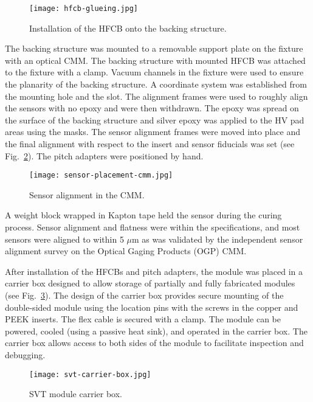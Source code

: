 \begin{figure}[hbt] 
\centering 
\texttt{[image: hfcb-glueing.jpg]}
\caption{Installation of the HFCB onto the backing structure.}
\label{fig:hfcb-glueing}
\end{figure}

The backing structure was mounted to a removable support plate on the fixture with an optical CMM. The backing structure with mounted HFCB was attached to the fixture with a clamp. Vacuum channels in the fixture were used to ensure the planarity of the backing structure. A coordinate system was established from the mounting hole and the slot. The alignment frames were used to roughly align the sensors with no epoxy and were then withdrawn. 
 The epoxy was spread on the surface of the backing structure and silver epoxy was applied to the HV pad areas using the masks. The sensor alignment frames were moved into place and the final alignment with respect to the insert and sensor fiducials was set (see Fig.~\ref{fig:sensor-placement-cmm}). The pitch adapters were positioned by hand. 
 
\begin{figure}[hbt] 
\centering 
\texttt{[image: sensor-placement-cmm.jpg]}
\caption{Sensor alignment in the CMM.}
\label{fig:sensor-placement-cmm}
\end{figure}

 A weight block wrapped in Kapton tape held the sensor during the curing process. Sensor alignment and flatness were within the specifications, and most sensors were aligned to within 5 $\mu$m as was validated by the independent sensor alignment survey on the Optical Gaging Products (OGP) CMM.

After installation of the HFCBs and pitch adapters, the module was placed in a carrier box designed to allow storage of partially and fully fabricated modules (see Fig.~\ref{fig:svt-carrier-box}). The design of the carrier box provides secure mounting of the double-sided module using the location pins with the screws in the copper and PEEK inserts. The flex cable is secured with a clamp. The module can be powered, cooled (using a passive heat sink), and operated in the carrier box. The carrier box allows access to both sides of the module to facilitate inspection and debugging. 

\begin{figure}[hbt] 
\centering 
\texttt{[image: svt-carrier-box.jpg]}
\caption{SVT module carrier box.}
\label{fig:svt-carrier-box}
\end{figure}

